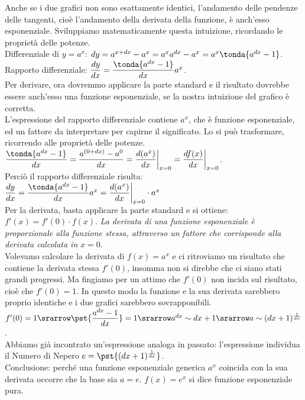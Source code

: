 Anche se i due grafici non sono esattamente identici, l'andamento delle 
pendenze delle tangenti, cioè l'andamento della derivata della funzione, è 
anch'esso esponenziale.
Sviluppiamo matematicamente questa intuizione, ricordando le proprietà
delle potenze.\\
Differenziale di $y=a^x$: 
$dy=a^{x+dx}-a^x=a^xa^{dx}-a^x=a^x\tonda{a^{dx}-1}$.\\
Rapporto differenziale: $\dfrac{dy}{dx}=\dfrac{\tonda{a^{dx}-1}}{dx}a^x$.\\
Per  derivare, ora dovremmo applicare la parte standard e il risultato dovrebbe
essere anch'esso una funzione esponenziale, se la nostra intuizione del grafico 
è corretta.\\
L'espressione del rapporto differenziale contiene \(a^x\), che è funzione 
esponenziale, ed un fattore da interpretare per capirne il significato. Lo
si può trasformare, ricorrendo alle proprietà delle potenze.\\
$\dfrac{\tonda{a^{dx}-1}}{dx}= \dfrac{a^{(0+dx)}-a^0}{dx}=
\dfrac{d(a^x)}{dx}\bigg |_{x=0}= \dfrac{df(x)}{dx}\bigg |_{x=0}$.\\
Perciò il rapporto differenziale risulta:\\
$\dfrac{dy}{dx}=\dfrac{\tonda{a^{dx}-1}}{dx}a^x=
\dfrac{d(a^x)}{dx}\bigg |_{x=0}\cdot a^x$\\
Per la derivata, basta applicare la parte standard e si ottiene:\\
$f'(x)= f'(0)\cdot f(x)$.
\emph{La derivata di una funzione esponenziale è proporzionale alla
funzione stessa, attraverso un fattore che corrisponde alla derivata 
calcolata in} $x=0$.\\

Volevamo calcolare la derivata di \(f(x)=a^x\) e ci ritroviamo
un risultato che contiene la derivata stessa \(f'(0)\), insomma non si direbbe 
che ci siano stati grandi progressi. Ma fingiamo per un attimo che $f'(0)$ non 
incida sul risultato, cioè che \(f'(0)=1\). In questo modo la funzione e la
sua derivata sarebbero proprio identiche e i due grafici sarebbero 
sovrapponibili.\\
$f'(0)=1\srarrow \pst{\dfrac{a^{dx}-1}{dx}}=1\srarrow a^{dx}\sim dx +1
\srarrow a\sim(dx+1)^\frac{1}{dx}$.\\
Abbiamo già incontrato un'espressione analoga in passato:
l'espressione individua il Numero di Nepero $e=\pst{(dx+1)^\frac{1}{dx}}$.\\
Conclusione: perché una funzione esponenziale generica $a^x$ coincida con la
sua derivata occorre che la base sia $a=e$. $f(x)=e^x$ si dice funzione 
esponenziale pura.


